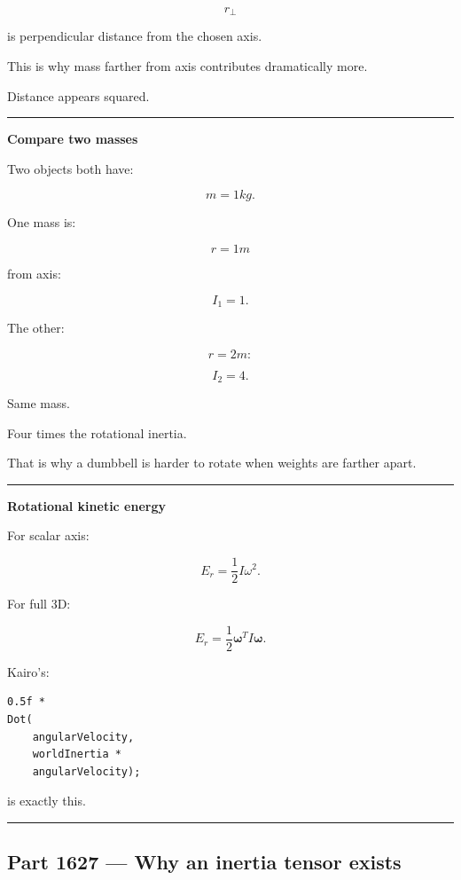 \[
r_\perp
\]

is perpendicular distance from the chosen axis.

This is why mass farther from axis contributes dramatically more.

Distance appears squared.

\begin{center}\rule{0.5\linewidth}{0.5pt}\end{center}

\textbf{Compare two masses}

Two objects both have:

\[
m=1kg.
\]

One mass is:

\[
r=1m
\]

from axis:

\[
I_1=1.
\]

The other:

\[
r=2m:
\]

\[
I_2=4.
\]

Same mass.

Four times the rotational inertia.

That is why a dumbbell is harder to rotate when weights are farther apart.

\begin{center}\rule{0.5\linewidth}{0.5pt}\end{center}

\textbf{Rotational kinetic energy}

For scalar axis:

\[
E_r
=
\frac12I\omega^2.
\]

For full 3D:

\[
\boxed{
E_r
=
\frac12
\boldsymbol{\omega}^T
I
\boldsymbol{\omega}.
}
\]

Kairo's:

\begin{verbatim}
0.5f *
Dot(
    angularVelocity,
    worldInertia *
    angularVelocity);
\end{verbatim}

is exactly this.

\begin{center}\rule{0.5\linewidth}{0.5pt}\end{center}

\subsection{Part 1627 --- Why an inertia tensor exists}\label{06-engine-ii-ch035-part-1627-why-an-inertia-tensor-exists}

